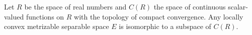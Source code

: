 Let $R$ be the space of real numbers and $C(R)$ the space of continuous scalar-valued functions on $R$ with the topology of compact convergence. Any locally convex metrizable separable space $E$ is isomorphic to a subspace of $C(R)$.
